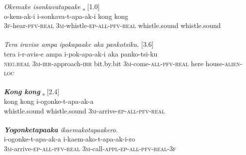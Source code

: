 \documentclass[output=paper]{LSP/langsci}
\begin{document}
\begin{exe}
\ex \label{Em13ad}
\begin{xlist}
\ex \label{Emex:13a}
\glt \textit{Okemake isonkavatapaake \underline{.}} [1.0]\\
\gll o-kem-ak-i i-sonkava-t-apa-ak-i kong kong\\
 \textsc{3f-}hear\textsc{-pfv-real} \textsc{3m-}whistle\textsc{-ep-all-pfv-real} whistle.sound whistle.sound\\
\glt {}\\
\ex \label{Emex:13b}
\glt \textit{Tera iravise ampa ipokapaake aka pankotsiku.} [3.6]\\
\gll tera i-r-avis-e ampa i-pok-apa-ak-i aka panko-tsi-ku\\
 \textsc{neg.real} \textsc{3m-irr-}approach\textsc{-irr} bit.by.bit \textsc{3m-}come\textsc{-all-pfv-real} here house\textsc{-alien-loc}\\
\glt {}\\
\ex \label{Emex:13c}
\glt \textit{\textbf{Kong kong} \underline{.}} [2.4]\\
\gll kong kong i-ogonke-t-apa-ak-a\\
 whistle.sound whistle.sound \textsc{3m-}arrive\textsc{-ep-all-pfv-real}\\
\glt {}\\

\ex \label{Emex:13d}
\glt \textit{\textbf{Yogonketapaaka} ikaemakotapaakero.}\\
\gll  i-ogonke-t-apa-ak-a i-kaem-ako-t-apa-ak-i-ro \\     	      
   \textsc{3m-}arrive\textsc{-ep-all-pfv-real} \textsc{3m-}call\textsc{-appl-ep-all-pfv-real-3f}\\
\glt {}
\end{xlist}
\end{exe}


%
\end{document}
